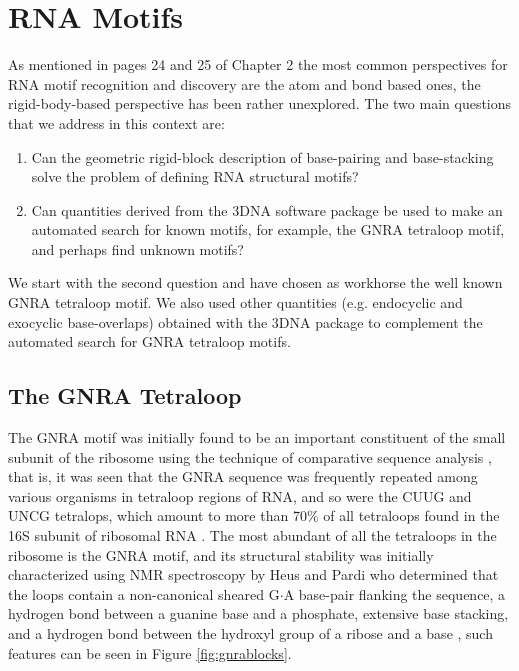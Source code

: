 \chapter{RNA Motifs}
\label{motifs} 
 As mentioned  in pages 24 and 25  of Chapter 2
the most  common perspectives for RNA motif  recognition and discovery
are the atom and bond based ones, the rigid-body-based perspective has
been rather  unexplored.  The  two main questions  that we  address in
this context are:

\begin{enumerate}
\item{Can  the geometric rigid-block  description of  base-pairing and
  base-stacking solve the problem of defining RNA structural motifs?}
\item{Can quantities derived from the 3DNA  software package be
  used to make an automated search for known motifs, for example, the
  GNRA tetraloop motif, and perhaps find unknown motifs?}
\end{enumerate}

We start with the  second question and have chosen as workhorse
the  well  known  GNRA  tetraloop  motif.  We  also  used  other
quantities  (e.g.  endocyclic  and  exocyclic base-overlaps)  obtained
with the 3DNA \cite{lu2003, lu2008b} package to  complement the
automated search for GNRA tetraloop motifs.

\section{The GNRA Tetraloop}
The GNRA motif  was initially found to be  an important constituent of
the small subunit  of the ribosome using the  technique of comparative
sequence analysis \cite{woese1990}, that is, it was seen that the GNRA
sequence was frequently repeated  among various organisms in tetraloop
regions of RNA, and so were  the CUUG and UNCG tetralops, which amount
to  more than  70\% of  all  tetraloops found  in the  16S subunit  of
ribosomal RNA \cite{woese1990, depaul2010}.   The most abundant of all
the tetraloops in  the ribosome is the GNRA  motif, and its structural
stability was  initially characterized using NMR  spectroscopy by Heus
and  Pardi \cite{heus1991}  who determined  that the  loops  contain a
non-canonical  sheared G$\cdot$A  base-pair flanking  the  sequence, a
hydrogen bond between  a guanine base and a  phosphate, extensive base
stacking, and a  hydrogen bond between the hydroxyl  group of a ribose
and  a base  \cite{heus1991},  such  features can  be  seen in  Figure
\ref{fig:gnrablocks}.

